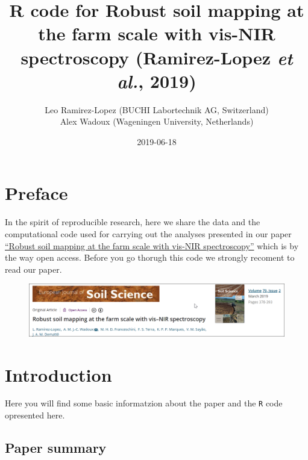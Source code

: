 \documentclass[]{book}
\title{R code for Robust soil mapping at the farm scale with vis-NIR spectroscopy (Ramirez-Lopez \emph{et al.}, 2019)}
\author{Leo Ramirez-Lopez (BUCHI Labortechnik AG, Switzerland) \\ Alex Wadoux (Wageningen University, Netherlands)}
\date{2019-06-18}
\begin{document}
\maketitle

{
\setcounter{tocdepth}{1}
\tableofcontents
}
\hypertarget{preface}{%
\chapter*{Preface}\label{preface}}

In the spirit of reproducible research, here we share the data and the computational code
used for carrying out the analyses presented in our paper \href{https://onlinelibrary.wiley.com/doi/10.1111/ejss.12752}{``Robust soil mapping at the farm scale with vis-NIR spectroscopy''} which is by the way open access. Before you go thorugh this code we strongly recoment to read our paper.

\begin{figure}
\includegraphics[width=0.9\linewidth]{./maps/paperimg} \end{figure}

\hypertarget{intro}{%
\chapter{Introduction}\label{intro}}

Here you will find some basic informatzion about the paper and the \texttt{R} code opresented here.

\hypertarget{paper-summary}{%
\section{Paper summary}\label{paper-summary}}
\end{document}
